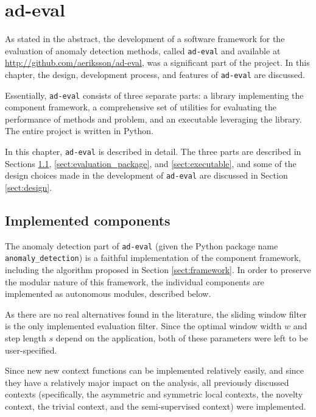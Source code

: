 \chapter{ad-eval}
\label{ch:implementation}

As stated in the abstract, the development of a software framework for the evaluation of anomaly detection methods, called \texttt{ad-eval} and available at \url{http://github.com/aeriksson/ad-eval}, was a significant part of the project. In this chapter, the design, development process, and features of \texttt{ad-eval} are discussed.

Essentially, \texttt{ad-eval} consists of three separate parts: a library implementing the component framework, a comprehensive set of utilities for evaluating the performance of methods and problem, and an executable leveraging the library. The entire project is written in Python.

In this chapter, \texttt{ad-eval} is described in detail. The three parts are described in Sections \ref{sect:implemented_problems}, \ref{sect:evaluation_package}, and \ref{sect:executable}, and some of the design choices made in the development of \texttt{ad-eval} are discussed in Section \ref{sect:design}.

\section{Implemented components}
\label{sect:implemented_problems}

The anomaly detection part of \texttt{ad-eval} (given the Python package name \texttt{anomaly\_detection}) is a faithful implementation of the component framework, including the algorithm proposed in Section \ref{sect:framework}. In order to preserve the modular nature of this framework, the individual components are implemented as autonomous modules, described below.

As there are no real alternatives found in the literature, the sliding window filter is the only implemented evaluation filter. Since the optimal window width $w$ and step length $s$ depend on the application, both of these parameters were left to be user-specified.

Since new new context functions can be implemented relatively easily, and since they have a relatively major impact on the analysis, all previously discussed contexts (specifically, the asymmetric and symmetric local contexts, the novelty context, the trivial context, and the semi-supervised context) were implemented.

